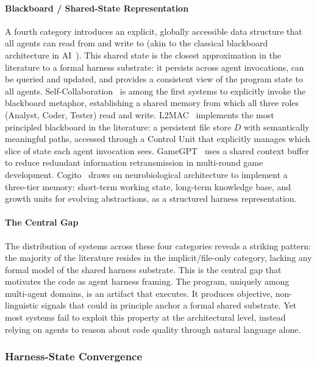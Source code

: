 \documentclass{llmxive}
\begin{document}
\paragraph{Blackboard / Shared-State Representation}

A fourth category introduces an explicit, globally accessible
data structure that all agents can read from and write to (akin
to the classical blackboard architecture in
AI~\cite{erman1980hearsay}). This shared state is the closest
approximation in the literature to a formal harness substrate: it
persists across agent invocations, can be queried and updated,
and provides a consistent view of the program state to all
agents. Self-Collaboration~\cite{Dong2024SelfCollaboration} is
among the first systems to explicitly invoke the blackboard
metaphor, establishing a shared memory from which all three roles
(Analyst, Coder, Tester) read and write.
L2MAC~\cite{Holt2023L2MAC} implements the most principled
blackboard in the literature: a persistent file store $D$ with
semantically meaningful paths, accessed through a Control Unit
that explicitly manages which slice of state each agent
invocation sees. GameGPT~\cite{chen2023gamegpt} uses a shared
context buffer to reduce redundant information retransmission in
multi-round game development. Cogito~\cite{Li2025Cogito} draws on
neurobiological architecture to implement a three-tier memory:
short-term working state, long-term knowledge base, and growth
units for evolving abstractions, as a structured harness
representation.

\paragraph{The Central Gap}

The distribution of systems across these four categories reveals
a striking pattern: the majority of the literature resides in the
implicit/file-only category, lacking any formal model of the
shared harness substrate. This is the central gap that motivates
the code as agent harness framing. The program, uniquely among
multi-agent domains, is an artifact that executes. It produces
objective, non-linguistic signals that could in principle anchor
a formal shared substrate. Yet most systems fail to exploit this
property at the architectural level, instead relying on agents to
reason about code quality through natural language alone.


\subsubsection{Harness-State Convergence}
\end{document}
